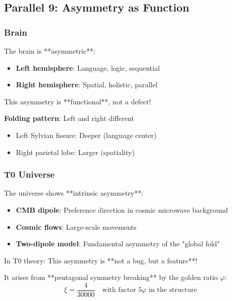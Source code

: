 	\subsection{Parallel 9: Asymmetry as Function}
	
	\subsubsection{Brain}
	
	The brain is **asymmetric**:
	
	\begin{itemize}
		\item \textbf{Left hemisphere}: Language, logic, sequential
		\item \textbf{Right hemisphere}: Spatial, holistic, parallel
	\end{itemize}
	
	This asymmetry is **functional**, not a defect!
	
	\textbf{Folding pattern}: Left and right different
	\begin{itemize}
		\item Left Sylvian fissure: Deeper (language center)
		\item Right parietal lobe: Larger (spatiality)
	\end{itemize}
	
	\subsubsection{T0 Universe}
	
	The universe shows **intrinsic asymmetry**:
	
	\begin{itemize}
		\item \textbf{CMB dipole}: Preference direction in cosmic microwave background
		\item \textbf{Cosmic flows}: Large-scale movements
		\item \textbf{Two-dipole model}: Fundamental asymmetry of the "global fold"
	\end{itemize}
	
	In T0 theory: This asymmetry is **not a bug, but a feature**!
	
	It arises from **pentagonal symmetry breaking** by the golden ratio $\varphi$:
	\begin{equation}
		\xi = \frac{4}{30000} \quad \text{with factor } 5\varphi \text{ in the structure}
	\end{equation}
	
